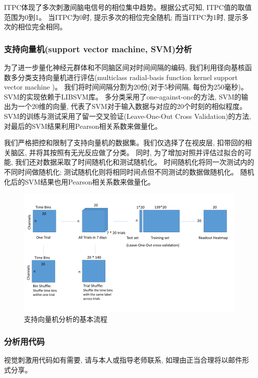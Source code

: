 ITPC体现了多次刺激间脑电信号的相位集中趋势。根据公式可知, ITPC值的取值范围为0到1。
当ITPC为0时, 提示多次的相位完全随机; 而当ITPC为1时, 提示多次的相位完全相同。

\subsubsection{支持向量机(support vector machine, SVM)分析}
为了进一步量化神经元群体和不同脑区间对时间间隔的编码,
我们利用径向基核函数多分类支持向量机进行评估(multiclass radial-basis function kernel support vector machine )。
我们将时间间隔分割为20份(对于5秒间隔, 每份为250毫秒)。
SVM的实现依赖于LIBSVM库\cite{chang2011libsvm}。
多分类采用了one-against-one的方法, SVM的输出为一个20维的向量, 代表了SVM对于输入数据与对应的20个时刻的相似程度。
SVM的训练与测试采用了留一交叉验证(Leave-One-Out Cross Validation)的方法, 对最后的SVM结果利用Pearson相关系数来做量化。

我们严格把控和限制了支持向量机的数据集。我们仅选择了在视皮层, 扣带回的相关脑区, 并将其按照有无光反应做了分类。
同时, 为了增加对照并评估过拟合的可能, 我们还对数据采取了时间随机化和测试随机化。
时间随机化将同一次测试内的不同时间做随机化;
测试随机化则将相同时间点但不同测试的数据做随机化。
随机化后的SVM结果也用Pearson相关系数来做量化。

\begin{figure}[h]
    \centering
    \includegraphics[width=\textwidth]{src/figures/svm_workflow.pdf}
    \caption{支持向量机分析的基本流程}
    \label{fig:svm_scheme}
\end{figure}

\subsubsection{分析用代码}
视觉刺激用代码如有需要, 请与本人或指导老师联系, 如理由正当合理将以邮件形式分享。
